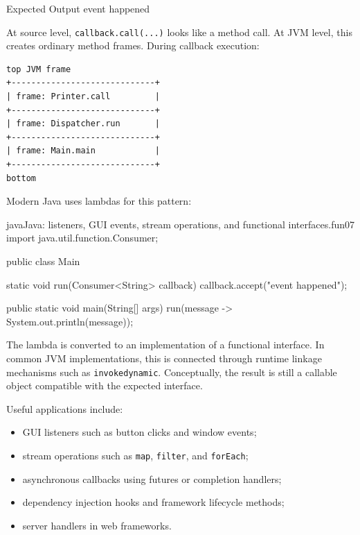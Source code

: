 \documentclass[a4paper,twoside]{report}
\begin{document}
\begin{iobox}{Expected Output}
event happened \\
\end{iobox}



At source level, \texttt{callback.call(...)} looks like a method call. At JVM level, this creates ordinary method frames. During callback execution:

\begin{verbatim}
top JVM frame
+-----------------------------+
| frame: Printer.call         |
+-----------------------------+
| frame: Dispatcher.run       |
+-----------------------------+
| frame: Main.main            |
+-----------------------------+
bottom
\end{verbatim}

Modern Java uses lambdas for this pattern:

\begin{codebox}[]{java}{Java: listeners, GUI events, stream operations, and functional interfaces.}{fun07}
import java.util.function.Consumer;

public class Main {
    static void run(Consumer<String> callback) {
        callback.accept("event happened");
    }

    public static void main(String[] args) {
        run(message -> System.out.println(message));
    }
}
\end{codebox}


The lambda is converted to an implementation of a functional interface. In common JVM implementations, this is connected through runtime linkage mechanisms such as \texttt{invokedynamic}. Conceptually, the result is still a callable object compatible with the expected interface.

Useful applications include:

\begin{itemize}
    \item GUI listeners such as button clicks and window events;
    \item stream operations such as \texttt{map}, \texttt{filter}, and \texttt{forEach};
    \item asynchronous callbacks using futures or completion handlers;
    \item dependency injection hooks and framework lifecycle methods;
    \item server handlers in web frameworks.
\end{itemize}
\end{document}

